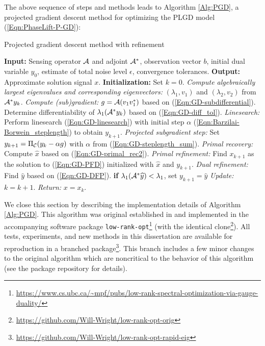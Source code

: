 The above sequence of steps and methods leads to Algorithm \ref{Alg:PGD}, a projected gradient descent method for optimizing the PLGD model  (\ref{Eqn:PhaseLift-P-GD}):
\begin{algorithm}[H]
\caption{Projected gradient descent method with refinement} 	\label{Alg:PGD}

\begin{algorithmic}[1]
	\Statex 	\textbf{Input:} Sensing operator ${\mathcal A}$ and adjoint ${\mathcal A}^*$, observation vector $b$,
	initial dual variable $y_0$, estimate of total noise level $\epsilon$,  convergence
	tolerances.
	\Statex 	\textbf{Output:} Approximate solution signal $x$.
	\Statex		\textbf{Initialization:} Set $k = 0$.
		\State 		\textit{Compute algebraically largest eigenvalues and corresponding eigenvectors:} $(\lambda_1, v_1)$ and  $(\lambda_2, v_2)$ from ${\mathcal A}^*y_k$.
		\State 		\textit{Compute (sub)gradient:} $g = {\mathcal A}(v_1 v_1^*)$ based on  (\ref{Eqn:GD-subdifferential}).
		\State		Determine differentiability of $\lambda_1({\mathcal A}^*y_k)$ based on (\ref{Eqn:GD-diff_tol}).
			\State		\textit{Linesearch:} Perform linesearch (\ref{Eqn:GD-linesearch}) with initial step $\alpha$ (\ref{Eqn:Barzilai-Borwein_steplength}) to obtain $y_{k+1}$.	
		\Else
			\State		\textit{Projected subgradient step:} Set $y_{k+1} = \Pi_{\mathcal C} (y_k - \alpha g)$ with $\alpha$ from (\ref{Eqn:GD-steplength_sum}).
		\EndIf
		\State		\textit{Primal recovery:} Compute $\hat{x}$ based on (\ref{Eqn:GD-primal_rec2}).
		\State		\textit{Primal refinement:} Find $x_{k+1}$ as the solution to (\ref{Eqn:GD-PFD}) initialized with $\hat{x}$ and $y_{k+1}$.
		 {}
			\State		\textit{Dual refinement:} Find $\widehat{y}$ based on (\ref{Eqn:GD-DFP}).
			\State		\textbf{if} $\lambda_1({\mathcal A}^* \widehat{y}) < \lambda_1$, set $y_{k+1} = \widehat{y}$
		\EndIf
			\State	\textit{Update:} $k = k+1$.
	\EndWhile
	\State	\textit{Return:} $x = x_k$. 
\end{algorithmic}

\end{algorithm}







We close this section by describing the implementation details of Algorithm \ref{Alg:PGD}.  
This algorithm was original established in \cite{DBLP:journals/siamsc/FriedlanderM16} and implemented in the accompanying software package \texttt{low-rank-opt}\footnote{\url{https://www.cs.ubc.ca/~mpf/pubs/low-rank-spectral-optimization-via-gauge-duality/}} (with the identical clone\footnote{\url{https://github.com/Will-Wright/low-rank-opt-orig}}).  
All tests, experiments, and new methods in this dissertation are available for reproduction in a branched package\footnote{\url{https://github.com/Will-Wright/low-rank-opt-rapid-eig}}.  
This branch includes a few minor changes to the original algorithm which are noncritical to the behavior of this algorithm (see the package repository for details).


